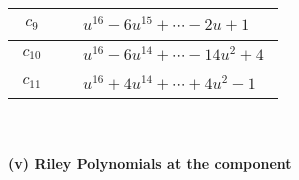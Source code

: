 \documentclass[1p]{elsarticle_modified}
\theoremstyle{definition}
\begin{document}
\begin{tabular}{m{50pt}|m{274pt}}
\hline $$\begin{aligned}c_{9}\end{aligned}$$&$\begin{aligned}
&u^{16}-6 u^{15}+\cdots-2 u+1
\end{aligned}$\\
\hline $$\begin{aligned}c_{10}\end{aligned}$$&$\begin{aligned}
&u^{16}-6 u^{14}+\cdots-14 u^2+4
\end{aligned}$\\
\hline $$\begin{aligned}c_{11}\end{aligned}$$&$\begin{aligned}
&u^{16}+4 u^{14}+\cdots+4 u^2-1
\end{aligned}$\\
\hline
\end{tabular}\\~\\
\newpage\renewcommand{\arraystretch}{1}
\flushleft \textbf{(v) Riley Polynomials at the component}\newline \\
\end{document}
